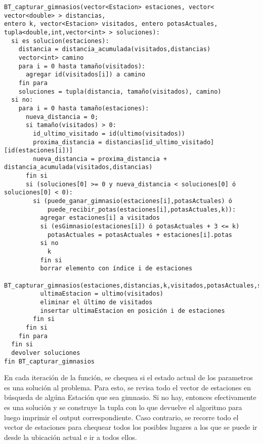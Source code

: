 \begin{itemize}
            \begin{codesnippet}
            \begin{verbatim}
BT_capturar_gimnasios(vector<Estacion> estaciones, vector< vector<double> > distancias,
entero k, vector<Estacion> visitados, entero potasActuales,
tupla<double,int,vector<int> > soluciones):
  si es solucion(estaciones):
    distancia = distancia_acumulada(visitados,distancias)
    vector<int> camino
    para i = 0 hasta tamaño(visitados):
      agregar id(visitados[i]) a camino
    fin para
    soluciones = tupla(distancia, tamaño(visitados), camino)
  si no:
    para i = 0 hasta tamaño(estaciones):
      nueva_distancia = 0;
      si tamaño(visitados) > 0:
        id_ultimo_visitado = id(ultimo(visitados))
        proxima_distancia = distancias[id_ultimo_visitado][id(estaciones[i])]
        nueva_distancia = proxima_distancia + distancia_acumulada(visitados,distancias)
      fin si
      si (soluciones[0] >= 0 y nueva_distancia < soluciones[0] ó soluciones[0] < 0):
        si (puede_ganar_gimnasio(estaciones[i],potasActuales) ó
            puede_recibir_potas(estaciones[i],potasActuales,k)):
          agregar estaciones[i] a visitados
          si (esGimnasio(estaciones[i]) ó potasActuales + 3 <= k)
            potasActuales = potasActuales + estaciones[i].potas
          si no
            k
          fin si
          borrar elemento con índice i de estaciones
          BT_capturar_gimnasios(estaciones,distancias,k,visitados,potasActuales,soluciones)
          ultimaEstacion = ultimo(visitados)
          eliminar el último de visitados
          insertar ultimaEstacion en posición i de estaciones
        fin si
      fin si
    fin para
  fin si
  devolver soluciones
fin BT_capturar_gimnasios
            \end{verbatim}
            \end{codesnippet}

            En cada iteración de la función, se chequea si el estado actual de los parametros es una solución al problema. Para esto, se revisa todo el vector de estaciones en búsqueda de algúna Estación que sea gimnasio. Si no hay, entonces efectivamente es una solución y se construye la tupla con lo que devuelve el algoritmo para luego imprimir el output correspondiente. Caso contrario, se recorre todo el vector de estaciones para chequear todos los posibles lugares a los que se puede ir desde la ubicación actual e ir a todos ellos.


\end{itemize}
